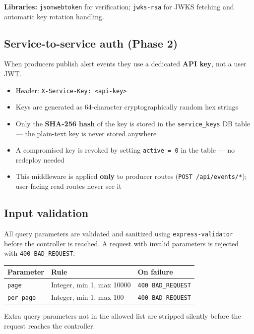 \documentclass[11pt]{article}
\begin{document}
\textbf{Libraries:} \texttt{jsonwebtoken} for verification; \texttt{jwks-rsa} for JWKS
fetching and automatic key rotation handling.

\subsection{Service-to-service auth (Phase 2)}

When producers publish alert events they use a dedicated \textbf{API key}, not a user JWT.

\begin{itemize}
  \item Header: \texttt{X-Service-Key: \textless api-key\textgreater}
  \item Keys are generated as 64-character cryptographically random hex strings
  \item Only the \textbf{SHA-256 hash} of the key is stored in the \texttt{service\_keys} DB table ---
        the plain-text key is never stored anywhere
  \item A compromised key is revoked by setting \texttt{active = 0} in the table --- no redeploy needed
  \item This middleware is applied \textbf{only} to producer routes (\texttt{POST /api/events/*});
        user-facing read routes never see it
\end{itemize}

\subsection{Input validation}

All query parameters are validated and sanitized using \texttt{express-validator} before the
controller is reached. A request with invalid parameters is rejected with \texttt{400 BAD\_REQUEST}.

\begin{table}[h]
\small
\begin{tabularx}{\textwidth}{l l X}
\toprule
\textbf{Parameter} & \textbf{Rule} & \textbf{On failure} \\
\midrule
\texttt{page} & Integer, min 1, max 10000 & \texttt{400 BAD\_REQUEST} \\
\texttt{per\_page} & Integer, min 1, max 100 & \texttt{400 BAD\_REQUEST} \\
\bottomrule
\end{tabularx}
\end{table}

Extra query parameters not in the allowed list are stripped silently before the request
reaches the controller.
\end{document}
